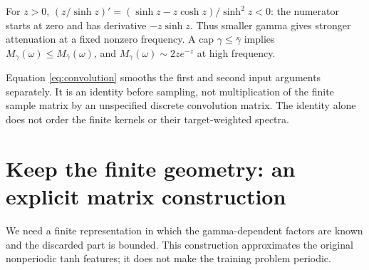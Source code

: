 \documentclass[11pt]{article}
\theoremstyle{definition}
\begin{document}
For $z>0$, $(z/\sinh z)'=(\sinh z-z\cosh z)/\sinh^2z<0$: the numerator
starts at zero and has derivative $-z\sinh z$. Thus smaller gamma gives
stronger attenuation at a fixed nonzero frequency. A cap
$\gamma\le\bar\gamma$ implies $M_\gamma(\omega)\le M_{\bar\gamma}(\omega)$,
and $M_\gamma(\omega)\sim2ze^{-z}$ at high frequency.

Equation \eqref{eq:convolution} smooths the first and second input arguments
separately. It is an identity before sampling, not multiplication of the
finite sample matrix by an unspecified discrete convolution matrix. The
identity alone does not order the finite kernels or their target-weighted spectra.

\section{Keep the finite geometry: an explicit matrix construction}
We need a finite representation in which the gamma-dependent factors are
known and the discarded part is bounded. This construction approximates the
original nonperiodic tanh features; it does not make the training problem periodic.
\end{document}
